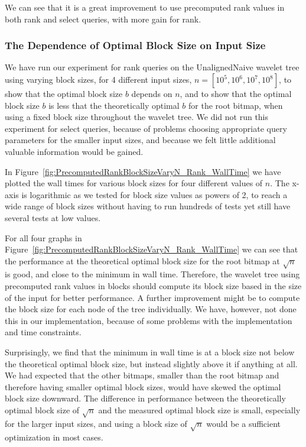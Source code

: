 We can see that it is a great improvement to use precomputed rank values in both rank and select queries, with more gain for rank.

\subsubsection{The Dependence of Optimal Block Size on Input Size}
\label{sec:expOptimalBlockSizeDependsOnInputSize}
We have run our experiment for rank queries on the UnalignedNaive wavelet tree using varying block sizes, for 4 different input sizes, $n = [10^5, 10^6, 10^7, 10^8]$, to show that the optimal block size $b$ depends on $n$, and to show that the optimal block size $b$ is less that the theoretically optimal $b$ for the root bitmap, when using a fixed block size throughout the wavelet tree.
We did not run this experiment for select queries, because of problems choosing appropriate query parameters for the smaller input sizes, and because we felt little additional valuable information would be gained.

In Figure~\ref{fig:PrecomputedRankBlockSizeVaryN_Rank_WallTime} we have plotted the wall times for various block sizes for four different values of $n$.
The x-axis is logarithmic as we tested for block size values as powers of 2, to reach a wide range of block sizes without having to run hundreds of tests yet still have several tests at low values.

For all four graphs in Figure~\ref{fig:PrecomputedRankBlockSizeVaryN_Rank_WallTime} we can see that the performance at the theoretical optimal block size for the root bitmap  at $\sqrt{n}$ is good, and close to the minimum in wall time.
Therefore, the wavelet tree using precomputed rank values in blocks should compute its block size based in the size of the input for better performance.
A further improvement might be to compute the block size for each node of the tree individually.
We have, however, not done this in our implementation, because of some problems with the implementation and time constraints.

Surprisingly, we find that the minimum in wall time is at a block size not below the theoretical optimal block size, but instead slightly above it if anything at all.
We had expected that the other bitmaps, smaller than the root bitmap and therefore having smaller optimal block sizes, would have skewed the optimal block size downward.
The difference in performance between the theoretically optimal block size of $\sqrt{n}$ and the measured optimal block size is small, especially for the larger input sizes, and using a block size of $\sqrt{n}$ would be a sufficient optimization in most cases.



